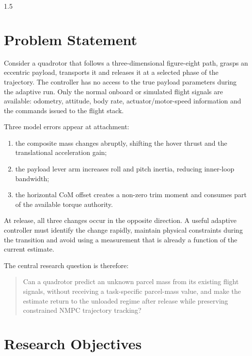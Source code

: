 \begin{spacing}{1.5}
\section{Problem Statement}

Consider a quadrotor that follows a three-dimensional figure-eight path, grasps an eccentric payload, transports it and releases it at a selected phase of the trajectory. The controller has no access to the true payload parameters during the adaptive run. Only the normal onboard or simulated flight signals are available: odometry, attitude, body rate, actuator/motor-speed information and the commands issued to the flight stack.

Three model errors appear at attachment:
\begin{enumerate}
    \item the composite mass changes abruptly, shifting the hover thrust and the translational acceleration gain;
    \item the payload lever arm increases roll and pitch inertia, reducing inner-loop bandwidth;
    \item the horizontal CoM offset creates a non-zero trim moment and consumes part of the available torque authority.
\end{enumerate}
At release, all three changes occur in the opposite direction. A useful adaptive controller must identify the change rapidly, maintain physical constraints during the transition and avoid using a measurement that is already a function of the current estimate.

The central research question is therefore:
\begin{quote}
Can a quadrotor predict an unknown parcel mass from its existing flight signals, without receiving a task-specific parcel-mass value, and make the estimate return to the unloaded regime after release while preserving constrained NMPC trajectory tracking?
\end{quote}

\section{Research Objectives}


\end{spacing}
